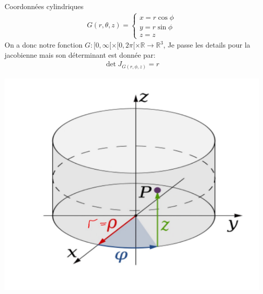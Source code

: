 \begin{parag}{Coordonnées cylindriques}
    \begin{align*} 
    G\left(r, \theta, z\right) =     \begin{cases}
            x =  r \cos\phi\\
            y =  r \sin \phi\\
            z =  z
        \end{cases}
    \end{align*}
    On a donc notre fonction $G: [0, \infty[ \times [ 0, 2\pi[ \times \mathbb{R} \to \mathbb{R}^{3}  $, Je passe les details pour la jacobienne mais son déterminant est donnée par:
    \begin{align*} \det J_{G\left(r, \phi, z\right)} =  r \end{align*}
    \begin{center}
        \includegraphics[scale=0.4]{72025-05-26.png}
    \end{center}
    
\end{parag}
